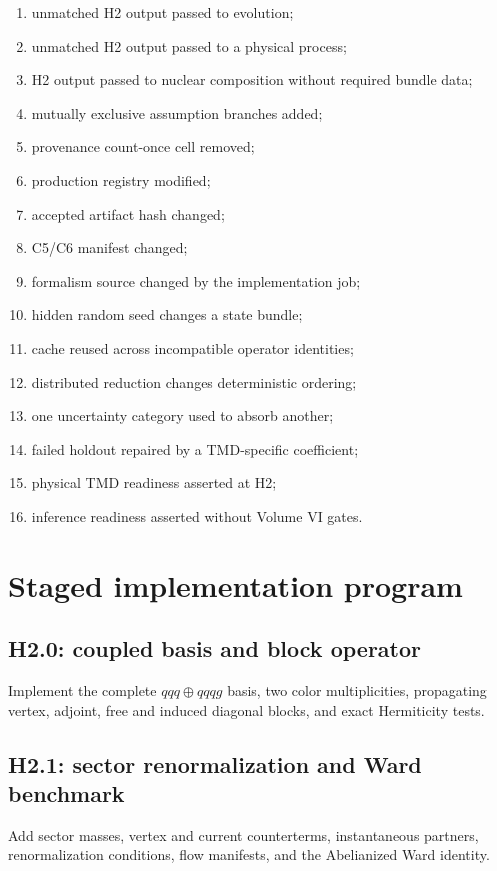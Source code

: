 \documentclass[11pt]{article}
\begin{document}
\begin{enumerate}
 \item unmatched H2 output passed to evolution;
 \item unmatched H2 output passed to a physical process;
 \item H2 output passed to nuclear composition without required bundle data;
 \item mutually exclusive assumption branches added;
 \item provenance count-once cell removed;
 \item production registry modified;
 \item accepted artifact hash changed;
 \item C5/C6 manifest changed;
 \item formalism source changed by the implementation job;
 \item hidden random seed changes a state bundle;
 \item cache reused across incompatible operator identities;
 \item distributed reduction changes deterministic ordering;
 \item one uncertainty category used to absorb another;
 \item failed holdout repaired by a TMD-specific coefficient;
 \item physical TMD readiness asserted at H2;
 \item inference readiness asserted without Volume VI gates.
\end{enumerate}

\section{Staged implementation program}

\subsection{H2.0: coupled basis and block operator}

Implement the complete \(qqq\oplus qqqg\) basis, two color multiplicities,
propagating vertex, adjoint, free and induced diagonal blocks, and exact
Hermiticity tests.

\subsection{H2.1: sector renormalization and Ward benchmark}

Add sector masses, vertex and current counterterms, instantaneous partners,
renormalization conditions, flow manifests, and the Abelianized Ward identity.
\end{document}
